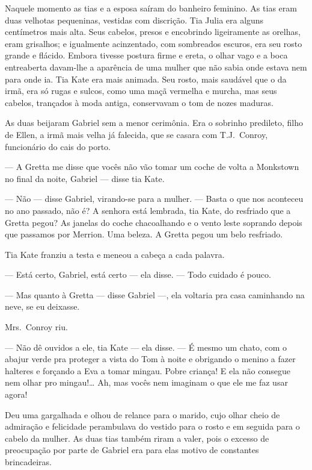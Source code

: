 Naquele momento as tias e a esposa saíram do banheiro feminino.  As tias eram
duas velhotas pequeninas, vestidas com discrição.  Tia Julia era alguns
centímetros mais alta.  Seus cabelos, presos e encobrindo ligeiramente as
orelhas, eram grisalhos; e igualmente acinzentado, com sombreados escuros, era
seu rosto grande e flácido.  Embora tivesse postura firme e ereta, o olhar vago
e a boca entreaberta davam-lhe a aparência de uma mulher que não sabia onde
estava nem para onde ia.  Tia Kate era mais animada.  Seu rosto, mais saudável
que o da irmã, era só rugas e sulcos, como uma maçã vermelha e murcha, mas seus
cabelos, trançados à moda antiga, conservavam o tom de nozes maduras.

As duas beijaram Gabriel sem a menor cerimônia.  Era o sobrinho predileto,
filho de Ellen, a irmã mais velha já falecida, que se casara com T.J.~Conroy,
funcionário do cais do porto.

--- A Gretta me disse que vocês não vão tomar um coche de volta a Monkstown no
final da noite, Gabriel --- disse tia Kate.

--- Não --- disse Gabriel, virando-se para a mulher.  --- Basta o que nos
aconteceu no ano passado, não é?  A senhora está lembrada, tia Kate, do
resfriado que a Gretta pegou?  As janelas do coche chacoalhando e o vento leste
soprando depois que passamos por Merrion.  Uma beleza.  A Gretta pegou um belo
resfriado.

Tia Kate franziu a testa e meneou a cabeça a cada palavra.

--- Está certo, Gabriel, está certo --- ela disse.  --- Todo cuidado é pouco.

--- Mas quanto à Gretta --- disse Gabriel ---, ela voltaria pra casa caminhando
na neve, se eu deixasse.

Mrs.~Conroy riu.

--- Não dê ouvidos a ele, tia Kate --- ela disse.  --- É mesmo um chato, com o
abajur verde pra proteger a vista do Tom à noite e obrigando o menino a fazer
halteres e forçando a Eva a tomar mingau.  Pobre criança!  E ela não consegue
nem olhar pro mingau!\ldots{}  Ah, mas vocês nem imaginam o que ele me faz usar
agora!

Deu uma gargalhada e olhou de relance para o marido, cujo olhar cheio de
admiração e felicidade perambulava do vestido para o rosto e em seguida para o
cabelo da mulher.  As duas tias também riram a valer, pois o excesso de
preocupação por parte de Gabriel era para elas motivo de constantes
brincadeiras.

